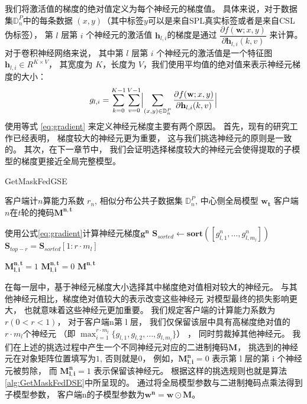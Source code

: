 我们将激活值的梯度的绝对值定义为每个神经元的梯度值。
具体来说，对于数据集$\mathbb{D}_n^P$中的每条数据
$(x, y)$（其中标签$y$可以是来自SPL真实标签或者是来自CSL伪标签），
第 $l$ 层第 $i$ 个神经元的激活值 $\mathbf{h}_{l,i}$的梯度是通过 
$\dfrac{\partial{f(\mathbf{w};x,y)}}{\partial{\mathbf{h}_{l,i}(k,v)}}$
来计算。
对于卷积神经网络来说，
其中第 $l$ 层第 $i$ 个神经元的激活值是一个特征图 $\mathbf{h}_{l,i} \in R^{K \times V}$，
其宽度为 $K$，长度为 $V$，我们使用平均值的绝对值来表示神经元梯度的大小：
\begin{equation}
    \label{eq:gradient}
    g_{l,i}=\sum_{k=0}^{K-1}\sum_{v=0}^{V-1}\Bigl| \sum_{(x,y)\in \mathbb{D}^P_n}\dfrac{\partial{f(\mathbf{w};x,y)}}{\partial{\mathbf{h}_{l,i}(k,v)}} \Bigr|
\end{equation}
使用等式 \ref{eq:gradient} 来定义神经元梯度主要有两个原因。
首先，现有的研究工作\cite{selvaraju2017grad}已经表明，
梯度较大的神经元更为重要，
这与我们挑选神经元的原则是一致的。
其次，在下一章节中，
我们会证明选择梯度较大的神经元会使得提取的子模型的梯度更接近全局完整模型。
\begin{algorithm}[t]
    \caption{GetMaskFedGSE}
    \label{alg:GetMaskFedGSE}
    \begin{algorithmic}[1]
    \Require 客户端计$n$算能力系数 $r_n$,
            相似分布公共子数据集 $\mathbb{D}^P_n$, 
            中心侧全局模型 $\mathbf{w_{t}}$
    \Ensure 客户端$n$在$t$轮的掩码$\mathbf{M^{n,t}}$
    
        \State 使用公式\ref{eq:gradient}计算神经元梯度$\mathbf{g^n}$
            \State $\mathbf{S}_{sorted} \leftarrow \textbf{sort}([g_{l,1}^n,\ldots, g_{l,m_l}^n])$
            \State $\mathbf{S}_{top-r} = \mathbf{S}_{sorted}[1 : r \cdot m_l]$
            
            $\mathbf{M^{n,t}_{l,i}} = 1$
            \Else \text{ }$\mathbf{M^{n,t}_{l,i}} = 0$
            \EndIf
        \EndFor
        \State \Return $\mathbf{M^{n,t}}$
    \EndProcedure
    \end{algorithmic}
\end{algorithm}

在每一层中，基于神经元梯度大小选择其中梯度绝对值相对较大的神经元。
与其他神经元相比，梯度绝对值较大的表示改变这些神经元
对模型最终的损失影响更大\cite{selvaraju2017grad}，
也就意味着这些神经元更加重要。
我们规定客户端的计算能力系数为$r(0<r<1)$，
对于客户端n第 l 层，
我们仅保留该层中具有高梯度绝对值的$ r \cdot m_l$个神经元
（即 ${\max_{i=1}^{r \cdot m_l }}\{g_{l,1},g_{l,2},\dots,g_{l,m_l}\}$） ，
同时剪裁掉其他神经元。
我们在上述的挑选过程中产生一个不同神经元对应的二进制掩码$\mathbf{M}$，
挑选到的神经元在对象矩阵位置填写为$1$,
否则就是$0$，
例如，$\mathbf{M^n_{l,i}}=0$ 表示第 l 层的第 i 个神经元被剪除，
而 $\mathbf{M^n_{l,i}}=1 $ 表示保留该神经元。
根据这样的挑选规则也就是算法\ref{alg:GetMaskFedDSE}中所呈现的。
通过将全局模型参数与二进制掩码点乘法得到子模型参数，
客户端n的子模型参数为$\mathbf{w^n}=\mathbf{w} \odot \mathbf{M}$。




